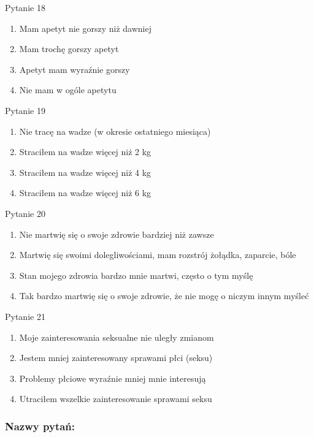 \documentclass[
  openany]{book}
\providecommand{\tightlist}{%
  \setlength{\itemsep}{0pt}\setlength{\parskip}{0pt}}
\begin{document}
Pytanie 18

\begin{enumerate}
\def\labelenumi{\arabic{enumi}.}
\setcounter{enumi}{-1}
\tightlist
\item
  Mam apetyt nie gorszy niż dawniej
\item
  Mam trochę gorszy apetyt
\item
  Apetyt mam wyraźnie gorszy
\item
  Nie mam w ogóle apetytu
\end{enumerate}

Pytanie 19

\begin{enumerate}
\def\labelenumi{\arabic{enumi}.}
\setcounter{enumi}{-1}
\tightlist
\item
  Nie tracę na wadze (w okresie ostatniego miesiąca)
\item
  Straciłem na wadze więcej niż 2 kg
\item
  Straciłem na wadze więcej niż 4 kg
\item
  Straciłem na wadze więcej niż 6 kg
\end{enumerate}

Pytanie 20

\begin{enumerate}
\def\labelenumi{\arabic{enumi}.}
\setcounter{enumi}{-1}
\tightlist
\item
  Nie martwię się o swoje zdrowie bardziej niż zawsze
\item
  Martwię się swoimi dolegliwościami, mam rozstrój żołądka, zaparcie, bóle
\item
  Stan mojego zdrowia bardzo mnie martwi, często o tym myślę
\item
  Tak bardzo martwię się o swoje zdrowie, że nie mogę o niczym innym myśleć
\end{enumerate}

Pytanie 21

\begin{enumerate}
\def\labelenumi{\arabic{enumi}.}
\setcounter{enumi}{-1}
\tightlist
\item
  Moje zainteresowania seksualne nie uległy zmianom
\item
  Jestem mniej zainteresowany sprawami płci (seksu)
\item
  Problemy płciowe wyraźnie mniej mnie interesują
\item
  Utraciłem wszelkie zainteresowanie sprawami seksu
\end{enumerate}

\hypertarget{nazwy-pytaux144}{%
\subsubsection{Nazwy pytań:}\label{nazwy-pytaux144}}
\end{document}
